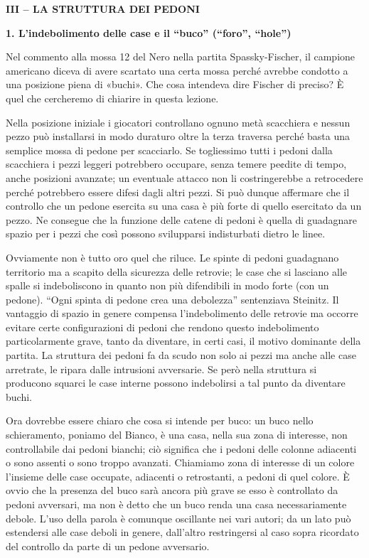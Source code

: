 \textbf{III -- LA STRUTTURA DEI PEDONI}

\textbf{1. L'indebolimento delle case e il ``buco'' (``foro'',
``hole'')}

Nel commento alla mossa 12 del Nero nella partita Spassky-Fischer, il
campione americano diceva di avere scartato una certa mossa perché
avrebbe condotto a una posizione piena di «buchi». Che cosa intendeva
dire Fischer di preciso? È quel che cercheremo di chiarire in questa
lezione.

Nella posizione iniziale i giocatori controllano ognuno metà scacchiera
e nessun pezzo può installarsi in modo duraturo oltre la terza traversa
perché basta una semplice mossa di pedone per scacciarlo. Se togliessimo
tutti i pedoni dalla scacchiera i pezzi leggeri potrebbero occupare,
senza temere pe¢dite di tempo, anche posizioni avanzate; un eventuale
attacco non li costringerebbe a retrocedere perché potrebbero essere
difesi dagli altri pezzi. Si può dunque affermare che il controllo che
un pedone esercita su una casa è più forte di quello esercitato da un
pezzo. Ne consegue che la funzione delle catene di pedoni è quella di
guadagnare spazio per i pezzi che così possono svilupparsi indisturbati
dietro le linee.

Ovviamente non è tutto oro quel che riluce. Le spinte di pedoni
guadagnano territorio ma a scapito della sicurezza delle retrovie; le
case che si lasciano alle spalle si indeboliscono in quanto non più
difendibili in modo forte (con un pedone). ``Ogni spinta di pedone crea
una debolezza'' sentenziava Steinitz. Il vantaggio di spazio in genere
compensa l'indebolimento delle retrovie ma occorre evitare certe
configurazioni di pedoni che rendono questo indebolimento
particolarmente grave, tanto da diventare, in certi casi, il motivo
dominante della partita. La struttura dei pedoni fa da scudo non solo ai
pezzi ma anche alle case arretrate, le ripara dalle intrusioni
avversarie. Se però nella struttura si producono squarci le case interne
possono indebolirsi a tal punto da diventare buchi.

Ora dovrebbe essere chiaro che cosa si intende per buco: un buco nello
schieramento, poniamo del Bianco, è una casa, nella sua zona di
interesse, non controllabile dai pedoni bianchi; ciò significa che i
pedoni delle colonne adiacenti o sono assenti o sono troppo avanzati.
Chiamiamo zona di interesse di un colore l'insieme delle case occupate,
adiacenti o retrostanti, a pedoni di quel colore. È ovvio che la
presenza del buco sarà ancora più grave se esso è controllato da pedoni
avversari, ma non è detto che un buco renda una casa necessariamente
debole. L'uso della parola è comunque oscillante nei vari autori; da un
lato può estendersi alle case deboli in genere, dall'altro restringersi
al caso sopra ricordato del controllo da parte di un pedone avversario.

